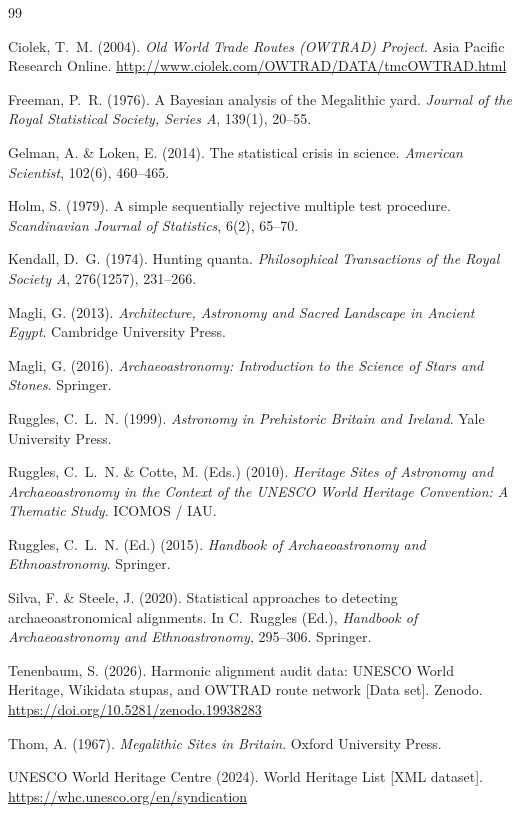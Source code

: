 \documentclass[12pt,a4paper]{article}
\begin{document}
\begin{thebibliography}{99}

Ciolek, T.~M. (2004).
\textit{Old World Trade Routes (OWTRAD) Project}.
Asia Pacific Research Online.
\url{http://www.ciolek.com/OWTRAD/DATA/tmcOWTRAD.html}

Freeman, P.~R. (1976).
A Bayesian analysis of the Megalithic yard.
\textit{Journal of the Royal Statistical Society, Series A}, 139(1),
20--55.

Gelman, A. \& Loken, E. (2014).
The statistical crisis in science.
\textit{American Scientist}, 102(6), 460--465.

Holm, S. (1979).
A simple sequentially rejective multiple test procedure.
\textit{Scandinavian Journal of Statistics}, 6(2), 65--70.

Kendall, D.~G. (1974).
Hunting quanta.
\textit{Philosophical Transactions of the Royal Society A},
276(1257), 231--266.

Magli, G. (2013).
\textit{Architecture, Astronomy and Sacred Landscape in Ancient Egypt}.
Cambridge University Press.

Magli, G. (2016).
\textit{Archaeoastronomy: Introduction to the Science of Stars and
Stones}.
Springer.

Ruggles, C.~L.~N. (1999).
\textit{Astronomy in Prehistoric Britain and Ireland}.
Yale University Press.

Ruggles, C.~L.~N. \& Cotte, M. (Eds.) (2010).
\textit{Heritage Sites of Astronomy and Archaeoastronomy in the Context
of the UNESCO World Heritage Convention: A Thematic Study}.
ICOMOS / IAU.

Ruggles, C.~L.~N. (Ed.) (2015).
\textit{Handbook of Archaeoastronomy and Ethnoastronomy}.
Springer.

Silva, F. \& Steele, J. (2020).
Statistical approaches to detecting archaeoastronomical alignments.
In C.~Ruggles (Ed.), \textit{Handbook of Archaeoastronomy and
Ethnoastronomy}, 295--306. Springer.

Tenenbaum, S. (2026).
Harmonic alignment audit data: UNESCO World Heritage, Wikidata stupas,
and OWTRAD route network [Data set].
Zenodo. \url{https://doi.org/10.5281/zenodo.19938283}

Thom, A. (1967).
\textit{Megalithic Sites in Britain}.
Oxford University Press.

UNESCO World Heritage Centre (2024).
World Heritage List [XML dataset].
\url{https://whc.unesco.org/en/syndication}

\end{thebibliography}
\end{document}

